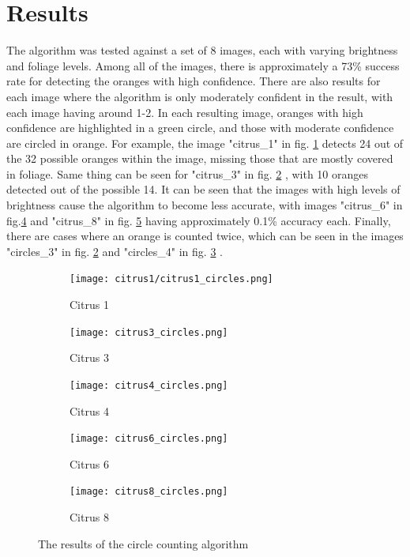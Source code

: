 \documentclass[conference]{IEEEtran}
\begin{document}
\section{Results}

The algorithm was tested against a set of 8 images, each with varying brightness and foliage levels. Among all of the images, there is approximately a 73\% success rate for detecting the oranges with high confidence. There are also results for each image where the algorithm is only moderately confident in the result, with each image having around 1-2. In each resulting image, oranges with high confidence are highlighted in a green circle, and those with moderate confidence are circled in orange. For example, the image "citrus\_1" in fig. \ref{fig:citrus_results_1} detects 24 out of the 32 possible oranges within the image, missing those that are mostly covered in foliage. Same thing can be seen for "citrus\_3" in fig. \ref{fig:citrus_results_3} , with 10 oranges detected out of the possible 14. It can be seen that the images with high levels of brightness cause the algorithm to become less accurate, with images "citrus\_6"  in fig.\ref{fig:citrus_results_6} and "citrus\_8" in fig. \ref{fig:citrus_results_8}  having approximately 0.1\% accuracy each. Finally, there are cases where an orange is counted twice, which can be seen in the images "circles\_3" in fig. \ref{fig:citrus_results_3} and "circles\_4" in fig. \ref{fig:citrus_results_4} .

\begin{figure}[H]
  \begin{subfigure}{.3\linewidth}
 	 \texttt{[image: citrus1/citrus1\_circles.png]}\hfill
	 \caption{Citrus 1} \label{fig:citrus_results_1}
  \end{subfigure}
   \begin{subfigure}{.3\linewidth}
 	 \texttt{[image: citrus3\_circles.png]}\hfill
	 \caption{Citrus 3}  \label{fig:citrus_results_3}
  \end{subfigure}
   \begin{subfigure}{.3\linewidth}
 	 \texttt{[image: citrus4\_circles.png]}
	 \caption{Citrus 4}  \label{fig:citrus_results_4}
  \end{subfigure}\par\medskip
  
    \begin{subfigure}{.3\linewidth}
 	 \texttt{[image: citrus6\_circles.png]}\hfill
	 \caption{Citrus 6}  \label{fig:citrus_results_6}
  \end{subfigure}
   \begin{subfigure}{.3\linewidth}
 	 \texttt{[image: citrus8\_circles.png]}
	 \caption{Citrus 8}  \label{fig:citrus_results_8}
  \end{subfigure}
  \caption{The results of the circle counting algorithm} \label{fig:citrus_results}
\end{figure}
\end{document}
